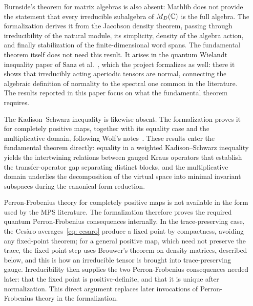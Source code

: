 Burnside's theorem for matrix algebras is also absent: Mathlib does not provide the statement that every irreducible subalgebra of $M_D(\mathbb{C})$ is the full algebra. The formalization derives it from the Jacobson density theorem, passing through irreducibility of the natural module, its simplicity, density of the algebra action, and finally stabilization of the finite-dimensional word spans. The fundamental theorem itself does not need this result. It arises in the quantum Wielandt inequality paper of Sanz et al.~\cite{Sanz2010Quantum}, which the project formalizes as well: there it shows that irreducibly acting aperiodic tensors are normal, connecting the algebraic definition of normality to the spectral one common in the literature. The results reported in this paper focus on what the fundamental theorem requires.

The Kadison--Schwarz inequality is likewise absent. The formalization proves it for completely positive maps, together with its equality case and the multiplicative domain, following Wolf's notes~\cite{Wolf2012Quantum}. These results enter the fundamental theorem directly: equality in a weighted Kadison--Schwarz inequality yields the intertwining relations between gauged Kraus operators that establish the transfer-operator gap separating distinct blocks, and the multiplicative domain underlies the decomposition of the virtual space into minimal invariant subspaces during the canonical-form reduction.

Perron-Frobenius theory for completely positive maps is not available in the form used by the MPS literature. The formalization therefore proves the required quantum Perron-Frobenius consequences internally. In the trace-preserving case, the Ces\`aro averages~\eqref{eq: cesaro} produce a fixed point by compactness, avoiding any fixed-point theorem; for a general positive map, which need not preserve the trace, the fixed-point step uses Brouwer's theorem on density matrices, described below, and this is how an irreducible tensor is brought into trace-preserving gauge. Irreducibility then supplies the two Perron-Frobenius consequences needed later: that the fixed point is positive-definite, and that it is unique after normalization. This direct argument replaces later invocations of Perron-Frobenius theory in the formalization.

